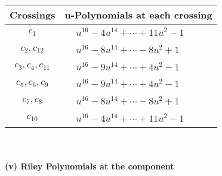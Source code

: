 \documentclass[1p]{elsarticle_modified}
\theoremstyle{definition}
\begin{document}
\begin{tabular}{m{50pt}|m{274pt}}
Crossings & \hspace{64pt}u-Polynomials at each crossing \\
\hline $$\begin{aligned}c_{1}\end{aligned}$$&$\begin{aligned}
&u^{16}-4 u^{14}+\cdots+11 u^2-1
\end{aligned}$\\
\hline $$\begin{aligned}c_{2},c_{12}\end{aligned}$$&$\begin{aligned}
&u^{16}-8 u^{14}+\cdots-8 u^2+1
\end{aligned}$\\
\hline $$\begin{aligned}c_{3},c_{4},c_{11}\end{aligned}$$&$\begin{aligned}
&u^{16}-9 u^{14}+\cdots+4 u^2-1
\end{aligned}$\\
\hline $$\begin{aligned}c_{5},c_{6},c_{9}\end{aligned}$$&$\begin{aligned}
&u^{16}-9 u^{14}+\cdots+4 u^2-1
\end{aligned}$\\
\hline $$\begin{aligned}c_{7},c_{8}\end{aligned}$$&$\begin{aligned}
&u^{16}-8 u^{14}+\cdots-8 u^2+1
\end{aligned}$\\
\hline $$\begin{aligned}c_{10}\end{aligned}$$&$\begin{aligned}
&u^{16}-4 u^{14}+\cdots+11 u^2-1
\end{aligned}$\\
\hline
\end{tabular}\\~\\
\newpage\renewcommand{\arraystretch}{1}
\flushleft \textbf{(v) Riley Polynomials at the component}\newline \\
\end{document}
